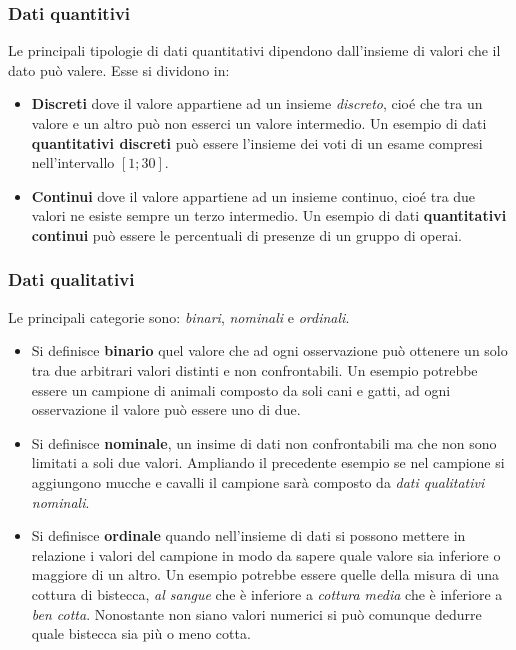 \documentclass{article}
\begin{document}
    \subsubsection{Dati quantitivi}
      Le principali tipologie di dati quantitativi dipendono dall'insieme di valori che il dato può valere. Esse si dividono in: 
      \begin{itemize}
        \item \textbf{Discreti} dove il valore appartiene ad un insieme \textit{discreto}, cioé che tra un valore e un altro può non esserci un valore intermedio. Un esempio di dati \textbf{quantitativi discreti} può essere l'insieme dei voti di un esame compresi nell'intervallo $[1;30]$. 
        \item \textbf{Continui} dove il valore appartiene ad un insieme continuo, cioé tra due valori ne esiste sempre un terzo intermedio. Un esempio di dati \textbf{quantitativi continui} può essere le percentuali di presenze di un gruppo di operai.
      \end{itemize}

    
    \subsubsection{Dati qualitativi}
      Le principali categorie sono: \textit{binari}, \textit{nominali} e \textit{ordinali}. 
      \begin{itemize}
        \item Si definisce \textbf{binario} quel valore che ad ogni osservazione può ottenere un solo tra due arbitrari valori distinti e non confrontabili. Un esempio potrebbe essere un campione di animali composto da soli cani e gatti, ad ogni osservazione il valore può essere uno di due. 
        \item Si definisce \textbf{nominale}, un insime di dati non confrontabili ma che non sono limitati a soli due valori. Ampliando il precedente esempio se nel campione si aggiungono mucche e cavalli il campione sarà composto da \textit{dati qualitativi nominali}. 
        \item Si definisce \textbf{ordinale} quando nell'insieme di dati si possono mettere in relazione i valori del campione in modo da sapere quale valore sia inferiore o maggiore di un altro. Un esempio potrebbe essere quelle della misura di una cottura di bistecca, \textit{al sangue} che è inferiore a \textit{cottura media} che è inferiore a \textit{ben cotta}. Nonostante non siano valori numerici si può comunque dedurre quale bistecca sia più o meno cotta. 
      \end{itemize} 
\end{document}
